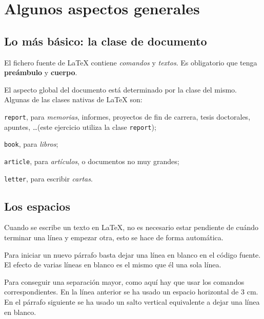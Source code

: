 \documentclass[a4paper]{report}
\begin{document}
\chapter{Algunos aspectos generales}




\section{Lo más básico: la clase de documento}

El fichero fuente de \LaTeX{}
contiene \textit{comandos} y \textit{textos}. 
Es obligatorio que tenga \textbf{preámbulo} y \textbf{cuerpo}.

El aspecto global del documento está determinado por la clase del
mismo. Algunas de las clases nativas de \LaTeX{} son: 

\noindent
\texttt{report}, para \textit{memorias}, informes, proyectos de fin de carrera,
tesis doctorales, apuntes, \dots (este ejercicio utiliza la clase \texttt{report}); 

\noindent
\texttt{book}, para \textit{libros}; 

\noindent
\texttt{article}, para \textit{artículos}, o documentos no muy grandes; 

\noindent
\texttt{letter}, para escribir \textit{cartas}.




\section{Los espacios}


Cuando se escribe un texto en \LaTeX{}, no es necesario estar pendiente 
de cuándo terminar una línea y empezar otra, esto se hace de forma automática.

Para iniciar un nuevo párrafo basta dejar una línea en blanco en el código fuente. 
El efecto de varias líneas en blanco es el mismo que él una sola línea.

Para conseguir una separación mayor, como aquí \hspace{3cm} hay que usar los
comandos correspondientes. En la línea anterior se ha usado un espacio horizontal de 3 cm. En el párrafo siguiente se ha usado un salto vertical equivalente a dejar una línea en blanco.\bigskip
\end{document}
